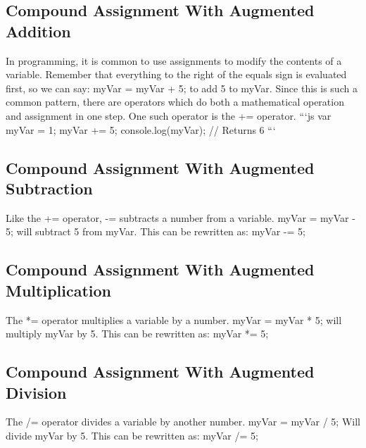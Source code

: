 \documentclass{article}%
\begin{document}
%
\subsection{Compound Assignment With Augmented Addition}%
\label{subsec:CompoundAssignmentWithAugmentedAddition}%
In programming, it is common to use assignments to modify the contents of a variable. Remember that everything to the right of the equals sign is evaluated first, so we can say:\newline%
myVar = myVar + 5;\newline%
to add 5 to myVar. Since this is such a common pattern, there are operators which do both a mathematical operation and assignment in one step.\newline%
One such operator is the += operator.\newline%
```js\newline%
var myVar = 1;\newline%
myVar += 5;\newline%
console.log(myVar); // Returns 6\newline%
```\newline%

%
\subsection{Compound Assignment With Augmented Subtraction}%
\label{subsec:CompoundAssignmentWithAugmentedSubtraction}%
Like the += operator, {-}= subtracts a number from a variable.\newline%
myVar = myVar {-} 5;\newline%
will subtract 5 from myVar. This can be rewritten as:\newline%
myVar {-}= 5;\newline%

%
\subsection{Compound Assignment With Augmented Multiplication}%
\label{subsec:CompoundAssignmentWithAugmentedMultiplication}%
The *= operator multiplies a variable by a number.\newline%
myVar = myVar * 5;\newline%
will multiply myVar by 5. This can be rewritten as:\newline%
myVar *= 5;\newline%

%
\subsection{Compound Assignment With Augmented Division}%
\label{subsec:CompoundAssignmentWithAugmentedDivision}%
The /= operator divides a variable by another number.\newline%
myVar = myVar / 5;\newline%
Will divide myVar by 5. This can be rewritten as:\newline%
myVar /= 5;\newline%
\end{document}
